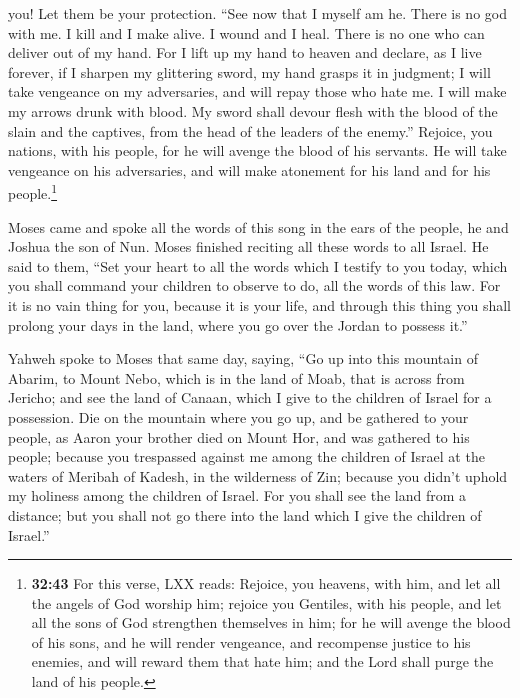 you! Let them be your protection.  ``See now that I
myself am he. There is no god with me. I kill and I make alive. I wound
and I heal. There is no one who can deliver out of my hand.
 For I lift up my hand to heaven and declare, as I live
forever,  if I sharpen my glittering sword, my hand
grasps it in judgment; I will take vengeance on my adversaries, and will
repay those who hate me.  I will make my arrows drunk
with blood. My sword shall devour flesh with the blood of the slain and
the captives, from the head of the leaders of the enemy.''
 Rejoice, you nations, with his people, for he will
avenge the blood of his servants. He will take vengeance on his
adversaries, and will make atonement for his land and for his
people.\footnote{\textbf{32:43} For this verse, LXX reads: Rejoice, you
  heavens, with him, and let all the angels of God worship him; rejoice
  you Gentiles, with his people, and let all the sons of God strengthen
  themselves in him; for he will avenge the blood of his sons, and he
  will render vengeance, and recompense justice to his enemies, and will
  reward them that hate him; and the Lord shall purge the land of his
  people.}

 Moses came and spoke all the words of this song in the
ears of the people, he and Joshua the son of Nun.  Moses
finished reciting all these words to all Israel.  He said
to them, ``Set your heart to all the words which I testify to you today,
which you shall command your children to observe to do, all the words of
this law.  For it is no vain thing for you, because it is
your life, and through this thing you shall prolong your days in the
land, where you go over the Jordan to possess it.''

 Yahweh spoke to Moses that same day, saying,
 ``Go up into this mountain of Abarim, to Mount Nebo,
which is in the land of Moab, that is across from Jericho; and see the
land of Canaan, which I give to the children of Israel for a possession.
 Die on the mountain where you go up, and be gathered to
your people, as Aaron your brother died on Mount Hor, and was gathered
to his people;  because you trespassed against me among
the children of Israel at the waters of Meribah of Kadesh, in the
wilderness of Zin; because you didn't uphold my holiness among the
children of Israel.  For you shall see the land from a
distance; but you shall not go there into the land which I give the
children of Israel.''

